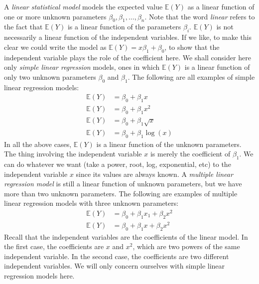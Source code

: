 \documentclass[12pt]{article}
\theoremstyle{definition}
\theoremstyle{remark}
\def\E{{\mathbb E}}
\begin{document}
A \emph{linear statistical model} models the expected value $\E(Y)$ as a linear function of one or more unknown parameters $\beta_0, \beta_1, \dots, \beta_n$. Note that the word \emph{linear} refers to the fact that $\E(Y)$ is a linear function of the parameters $\beta_i$. $\E(Y)$ is not necessarily a linear function of the independent variables. If we like, to make this clear we could write the model as $\E(Y) = x \beta_1 + \beta_0$, to show that the independent variable plays the role of the coefficient here. We shall consider here only \emph{simple linear regression} models, ones in which $\E(Y)$ is a linear function of only two unknown parameters $\beta_0$ and $\beta_1$. The following are all examples of simple linear regression models:
\begin{align*}
\E(Y) &= \beta_0 + \beta_1 x \\
\E(Y) &= \beta_0 + \beta_1 x^2 \\
\E(Y) &= \beta_0 + \beta_1 \sqrt{x} \\
\E(Y) &= \beta_0 + \beta_1 \log(x)
\end{align*}
In all the above cases, $\E(Y)$ is a linear function of the unknown parameters. The thing involving the independent variable $x$ is merely the coefficient of $\beta_1$. We can do whatever we want (take a power, root, log, exponential, etc) to the independent variable $x$ since its values are always known. A \emph{multiple linear regression model} is still a linear function of unknown parameters, but we have more than two unknown parameters. The following are examples of multiple linear regression models with three unknown parameters:
\begin{align*}
\E(Y) &= \beta_0 + \beta_1 x_1 + \beta_2 x^2 \\
\E(Y) &= \beta_0 + \beta_1 x + \beta_2 x^2
\end{align*}
Recall that the independent variables are the coefficients of the linear model. In the first case, the coefficients are $x$ and $x^2$, which are two powers of the same independent variable. In the second case, the coefficients are two different independent variables. We will only concern ourselves with simple linear regression models here.\\
\end{document}
